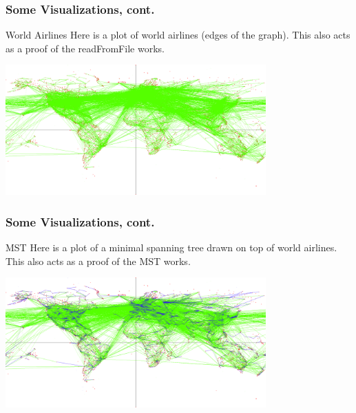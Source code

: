 \documentclass{beamer}
\begin{document}
\begin{frame}
\frametitle{Some Visualizations, cont.}
\begin{block}{World Airlines}
    Here is a plot of world airlines (edges of the graph). This also acts as a proof of the readFromFile works.
    \begin{center}
        \includegraphics[width=10cm]{plots/world-airlines.png}
    \end{center}
    
\end{block}
\end{frame}

\begin{frame}
\frametitle{Some Visualizations, cont.}
\begin{block}{MST}
    Here is a plot of a minimal spanning tree drawn on top of world airlines. This also acts as a proof of the MST works.
    \begin{center}
        \includegraphics[width=10cm]{plots/MST.png}
    \end{center}
    
\end{block}
\end{frame}
\end{document}
